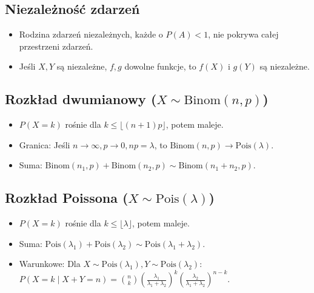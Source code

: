 \documentclass{article}
\theoremstyle{definition}
\theoremstyle{remark}
\begin{document}
\begin{multicols}{2}
    \subsection*{Niezależność zdarzeń}
    \begin{itemize}[itemsep=0pt, left=0pt]
        \item Rodzina zdarzeń niezależnych, każde o \( P(A) < 1 \), nie pokrywa całej przestrzeni zdarzeń.
        \item Jeśli \( X, Y \) są niezależne, \( f, g \) dowolne funkcje, to \( f(X) \) i \( g(Y) \) są niezależne.
    \end{itemize}
    
    \subsection*{Rozkład dwumianowy (\( X \sim \text{Binom}(n, p) \))}
    \begin{itemize}[itemsep=0pt, left=0pt]
        \item \( P(X=k) \) rośnie dla \( k \leq \lfloor (n+1)p \rfloor \), potem maleje.
        \item Granica: Jeśli \( n \to \infty, p \to 0, np = \lambda \), to \( \text{Binom}(n, p) \to \text{Pois}(\lambda) \).
        \item Suma: \( \text{Binom}(n_1, p) + \text{Binom}(n_2, p) \sim \text{Binom}(n_1+n_2, p) \).
    \end{itemize}
    
    \subsection*{Rozkład Poissona (\( X \sim \text{Pois}(\lambda) \))}
    \begin{itemize}[itemsep=0pt, left=0pt]
        \item \( P(X=k) \) rośnie dla \( k \leq \lfloor \lambda \rfloor \), potem maleje.
        \item Suma: \( \text{Pois}(\lambda_1) + \text{Pois}(\lambda_2) \sim \text{Pois}(\lambda_1+\lambda_2) \).
        \item Warunkowe: Dla \( X \sim \text{Pois}(\lambda_1), Y \sim \text{Pois}(\lambda_2) \): \\
        \(
        P(X=k \mid X+Y=n) = \binom{n}{k} \left(\frac{\lambda_1}{\lambda_1+\lambda_2}\right)^k \left(\frac{\lambda_2}{\lambda_1+\lambda_2}\right)^{n-k}.
        \)
    \end{itemize}
    

\end{multicols}
\end{document}
